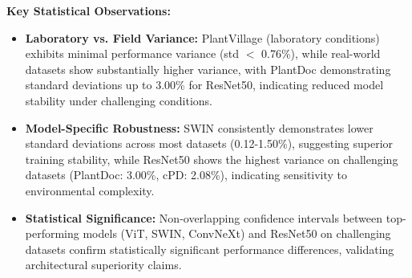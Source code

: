 \documentclass[sn-mathphys]{sn-jnl}
\theoremstyle{thmstyleone}%
\theoremstyle{thmstyletwo}%
\theoremstyle{thmstylethree}%
\begin{document}
\textbf{Key Statistical Observations:}

\begin{itemize}
    \item [--] \textbf{Laboratory vs. Field Variance:} PlantVillage (laboratory conditions) exhibits minimal performance variance (std $<$ 0.76\%), while real-world datasets show substantially higher variance, with PlantDoc demonstrating standard deviations up to 3.00\% for ResNet50, indicating reduced model stability under challenging conditions.
    
    \item [--] \textbf{Model-Specific Robustness:} SWIN consistently demonstrates lower standard deviations across most datasets (0.12-1.50\%), suggesting superior training stability, while ResNet50 shows the highest variance on challenging datasets (PlantDoc: 3.00\%, cPD: 2.08\%), indicating sensitivity to environmental complexity.
    
    \item [--] \textbf{Statistical Significance:} Non-overlapping confidence intervals between top-performing models (ViT, SWIN, ConvNeXt) and ResNet50 on challenging datasets confirm statistically significant performance differences, validating architectural superiority claims.
\end{itemize}
\end{document}
